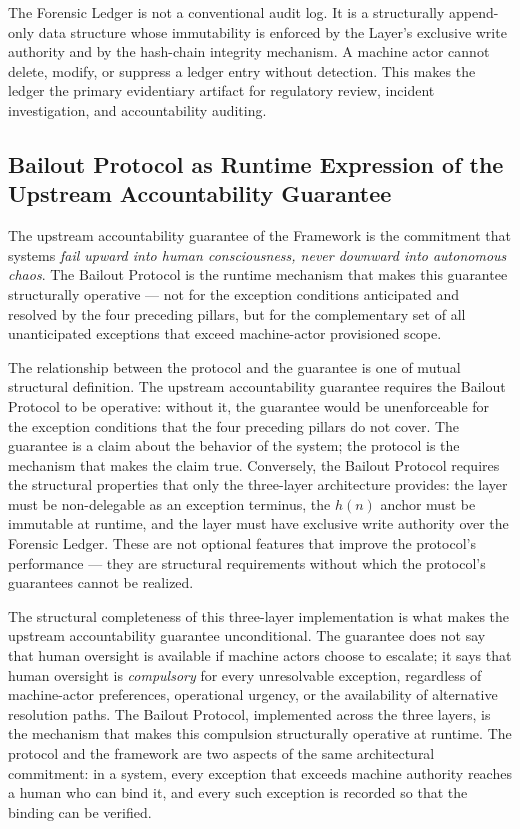 The Forensic Ledger is not a conventional audit log. It is a structurally append-only data structure whose immutability is enforced by the \fact{} Layer's exclusive write authority and by the hash-chain integrity mechanism. A machine actor cannot delete, modify, or suppress a ledger entry without detection. This makes the ledger the primary evidentiary artifact for regulatory review, incident investigation, and accountability auditing.

\subsection{Bailout Protocol as Runtime Expression of the Upstream Accountability Guarantee}
\label{sec:runtime-expression}

The upstream accountability guarantee of the \bxthree{} Framework is the commitment that \bxthree{} systems \emph{fail upward into human consciousness, never downward into autonomous chaos}. The Bailout Protocol is the runtime mechanism that makes this guarantee structurally operative — not for the exception conditions anticipated and resolved by the four preceding pillars, but for the complementary set of all unanticipated exceptions that exceed machine-actor provisioned scope.

The relationship between the protocol and the guarantee is one of mutual structural definition. The upstream accountability guarantee requires the Bailout Protocol to be operative: without it, the guarantee would be unenforceable for the exception conditions that the four preceding pillars do not cover. The guarantee is a claim about the behavior of the system; the protocol is the mechanism that makes the claim true. Conversely, the Bailout Protocol requires the structural properties that only the \bxthree{} three-layer architecture provides: the \purpose{} layer must be non-delegable as an exception terminus, the $h(n)$ anchor must be immutable at runtime, and the \fact{} layer must have exclusive write authority over the Forensic Ledger. These are not optional features that improve the protocol's performance — they are structural requirements without which the protocol's guarantees cannot be realized.

The structural completeness of this three-layer implementation is what makes the upstream accountability guarantee unconditional. The guarantee does not say that human oversight is available if machine actors choose to escalate; it says that human oversight is \emph{compulsory} for every unresolvable exception, regardless of machine-actor preferences, operational urgency, or the availability of alternative resolution paths. The Bailout Protocol, implemented across the three \bxthree{} layers, is the mechanism that makes this compulsion structurally operative at runtime. The protocol and the framework are two aspects of the same architectural commitment: in a \bxthree{} system, every exception that exceeds machine authority reaches a human who can bind it, and every such exception is recorded so that the binding can be verified.

